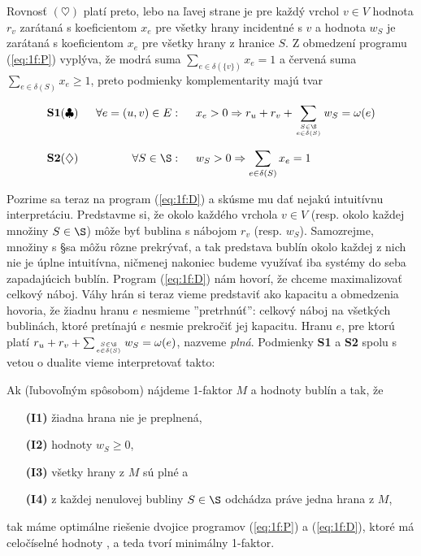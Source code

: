 \noindent
Rovnosť $(\heartsuit)$ platí preto, lebo na ľavej strane je
pre každý vrchol $v\in V$ hodnota $r_v$ zarátaná s koeficientom $x_e$
pre všetky hrany incidentné s $v$ a hodnota $w_S$ je zarátaná s koeficientom $x_e$ pre všetky hrany z hranice $S$.
Z obmedzení programu (\ref{eq:1f:P}) vyplýva, že modrá suma $\sum_{e\in\delta(\{v\})}x_e=1$ a
červená suma $\sum_{e\in\delta(S)}x_e\ge1$, preto podmienky komplementarity majú tvar

$$\begin{array}{lrl}
  {\bf S1} (\clubsuit) \;\;&\forall e=(u,v)\in E:\;\;&x_e>0\Rightarrow r_u + r_v +
  \displaystyle\sum\limits_{S\in\S\atop e\in\delta(S)}w_S=\omega(e)\\[6ex]
  {\bf S2} (\diamondsuit)\;\;&\forall S\in\S:\;\; & w_S>0\Rightarrow \displaystyle\sum\limits_{e\in\delta(S)}x_e=1
\end{array}$$


\noindent
Pozrime sa teraz na program (\ref{eq:1f:D}) a skúsme mu dať nejakú intuitívnu interpretáciu.
Predstavme si, že okolo každého vrchola $v\in V$ (resp. okolo každej  množiny $S\in\S$) 
môže byť bublina s nábojom $r_v$ (resp. $w_S$). Samozrejme, množiny s \S sa môžu rôzne prekrývať,
a tak predstava bublín okolo každej z nich nie je úplne intuitívna, ničmenej nakoniec budeme
využívať iba systémy do seba zapadajúcich bublín. Program (\ref{eq:1f:D}) nám hovorí,
že chceme maximalizovať celkový náboj. Váhy hrán si teraz vieme predstaviť ako kapacitu a obmedzenia
hovoria, že žiadnu hranu $e$ nesmieme ''pretrhnúť'': celkový náboj na všetkých bublinách, ktoré pretínajú
$e$ nesmie prekročiť jej kapacitu. 
Hranu $e$, pre ktorú platí $ r_u + r_v + \sum_{S\in\S\atop e\in\delta(S)}w_S=\omega(e)$, nazveme {\em plná}.
Podmienky {\bf S1} a {\bf S2} spolu s vetou o dualite vieme interpretovať takto:

\begin{lema}
  \label{lm:1f:opt}
  Ak (ľubovoľným spôsobom) nájdeme 1-faktor $M$ a hodnoty bublín  a  tak, že
  \begin{itemize}
    \item[{\bf (I1)}] žiadna hrana nie je preplnená,
    \item[{\bf (I2)}] hodnoty $w_S\ge 0$,
    \item[{\bf (I3)}] všetky hrany z $M$ sú plné  a
    \item[{\bf (I4)}]  z každej nenulovej bubliny $S\in\S$ odchádza práve jedna hrana z $M$,
\end{itemize}
  tak máme optimálne riešenie dvojice programov (\ref{eq:1f:P}) a (\ref{eq:1f:D}), ktoré má celočíselné
  hodnoty , a teda tvorí minimálny 1-faktor.
\end{lema}

